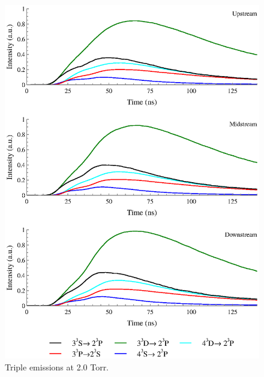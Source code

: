 \begin{figure}
  \centering
  \includegraphics{./chapters/extraem/figures/2torr_t.eps}
  \caption{Triple emissions at 2.0 Torr.}
\end{figure}

